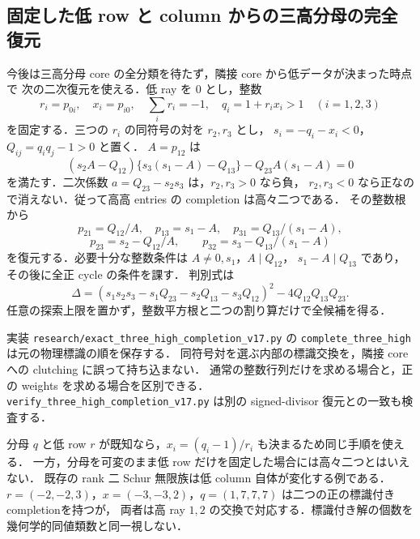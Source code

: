 \subsection{固定した低 row と column からの三高分母の完全復元}
\label{nc17:fixed-low}

今後は三高分母 core の全分類を待たず，隣接 core から低データが決まった時点で
次の二次復元を使える．低 ray を $0$ とし，整数
\[
 r_i=p_{0i},\quad x_i=p_{i0},\quad
 \sum_i r_i=-1,\quad q_i=1+r_ix_i>1\quad(i=1,2,3)
\]
を固定する．三つの $r_i$ の同符号の対を $r_2,r_3$ とし，
$s_i=-q_i-x_i<0$，$Q_{ij}=q_iq_j-1>0$ と置く．
$A=p_{12}$ は
\[
 (s_2A-Q_{12})\{s_3(s_1-A)-Q_{13}\}
 -Q_{23}A(s_1-A)=0
\]
を満たす．二次係数 $a=Q_{23}-s_2s_3$ は，$r_2,r_3>0$ なら負，
$r_2,r_3<0$ なら正なので消えない．従って高高 entries の completion は高々二つである．
その整数根から
\[
 p_{21}=Q_{12}/A,\quad p_{13}=s_1-A,\quad p_{31}=Q_{13}/(s_1-A),
\]
\[
 p_{23}=s_2-Q_{12}/A,\qquad p_{32}=s_3-Q_{13}/(s_1-A)
\]
を復元する．必要十分な整数条件は $A\ne0,s_1$，$A\mid Q_{12}$，
$s_1-A\mid Q_{13}$ であり，その後に全正 cycle の条件を課す．
判別式は
\[
 \Delta=(s_1s_2s_3-s_1Q_{23}-s_2Q_{13}-s_3Q_{12})^2
            -4Q_{12}Q_{13}Q_{23}.
\]
任意の探索上限を置かず，整数平方根と二つの割り算だけで全候補を得る．

実装 \nolinkurl{research/exact_three_high_completion_v17.py} の
\texttt{complete\_three\_high} は元の物理標識の順を保存する．
同符号対を選ぶ内部の標識交換を，隣接 core への clutching に誤って持ち込まない．
通常の整数行列だけを求める場合と，正の weights を求める場合を区別できる．
\nolinkurl{verify_three_high_completion_v17.py} は別の signed-divisor 復元との一致も検査する．

分母 $q$ と低 row $r$ が既知なら，$x_i=(q_i-1)/r_i$ も決まるため同じ手順を使える．
一方，分母を可変のまま低 row だけを固定した場合には高々二つとはいえない．
既存の rank 二 Schur 無限族は低 column 自体が変化する例である．
$r=(-2,-2,3)$，$x=(-3,-3,2)$，$q=(1,7,7,7)$ は二つの正の標識付きcompletionを持つが，
両者は高 ray $1,2$ の交換で対応する．標識付き解の個数を幾何学的同値類数と同一視しない．


